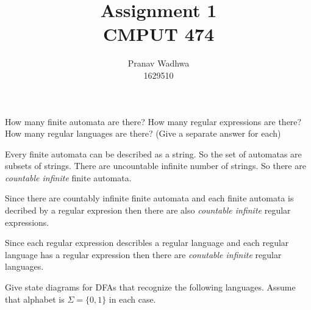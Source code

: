 \documentclass[12pt]{exam}
\title{
  Assignment 1\\
  \large CMPUT 474
}
\author{Pranav Wadhwa\\1629510}
\begin{document}
\maketitle
\noindent

\begin{questions}
  \question %
  How many finite automata are there? How many regular expressions are there? How many regular languages are there? (Give a separate answer for each)

  \begin{solution}

    Every finite automata can be described as a string. So the set of automatas are subsets of strings. There are uncountable infinite number of strings. So there are \emph{countable infinite} finite automata.

    Since there are countably infinite finite automata and each finite automata is decribed by a regular expresion then there are also \emph{countable infinite} regular expressions.

    Since each regular expression describles a regular language and each regular language has a regular expression then there are \emph{conutable infinite} regular languages.


  \end{solution}

  \question %

  Give state diagrams for DFAs that recognize the following languages. Assume that alphabet is $\Sigma = \{0,1\}$ in each case.

\end{questions}
\end{document}
